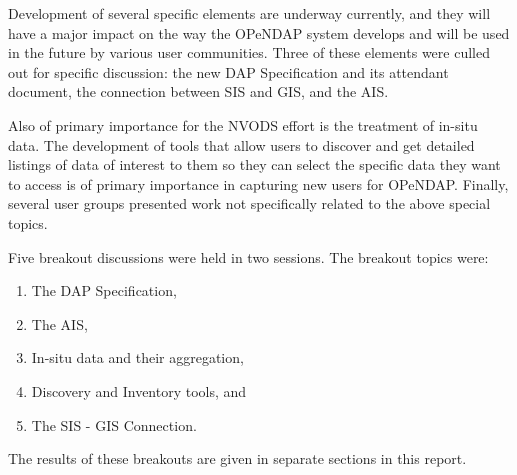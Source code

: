 Development of several specific elements are underway currently, and
they will have a major impact on the way the OPeNDAP system develops
and will be used in the future by various user communities.
Three of these elements were culled out for specific discussion:
the new \ac{DAP} Specification and its attendant document, the
connection between \ac{SIS} and \ac{GIS}, and the \ac{AIS}.  

Also of primary importance for the \ac{NVODS} effort is the
treatment of in-situ data.  The development of tools that allow
users to discover and get detailed listings of data of interest
to them so they can select the specific data they want to access
is of primary importance in capturing new users for 
\ac{OPeNDAP}.  Finally, several
user groups presented work not specifically related to the above
special topics.

Five breakout discussions were held in two sessions.  The
breakout topics were:

\begin{enumerate}
   \item The \ac{DAP} Specification,
   \item The \ac{AIS},
   \item In-situ data and their aggregation,
   \item Discovery and Inventory tools, and
   \item The \ac{SIS} - \ac{GIS} Connection.
\end{enumerate}

The results of these breakouts are given in separate sections
in this report.

%
%
%
%

